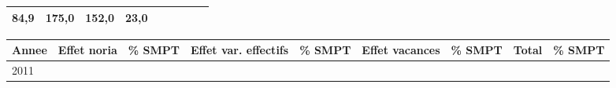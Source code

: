 \begin{longtable}[]{@{}lllllllll@{}}
\begin{minipage}[t]{0.10\columnwidth}
84,9\strut
\end{minipage} & \begin{minipage}[t]{0.07\columnwidth}\raggedright
175,0\strut
\end{minipage} & \begin{minipage}[t]{0.07\columnwidth}\raggedright
152,0\strut
\end{minipage} & \begin{minipage}[t]{0.11\columnwidth}\raggedright
23,0\strut
\end{minipage} & \begin{minipage}[t]{0.14\columnwidth}\raggedright
\strut
\end{minipage}\tabularnewline
\bottomrule
\end{longtable}

\begin{longtable}[]{@{}lllllllll@{}}
\toprule
\begin{minipage}[b]{0.05\columnwidth}\raggedright
Annee\strut
\end{minipage} & \begin{minipage}[b]{0.10\columnwidth}\raggedright
Effet noria\strut
\end{minipage} & \begin{minipage}[b]{0.06\columnwidth}\raggedright
\% SMPT\strut
\end{minipage} & \begin{minipage}[b]{0.16\columnwidth}\raggedright
Effet var. effectifs\strut
\end{minipage} & \begin{minipage}[b]{0.06\columnwidth}\raggedright
\% SMPT\strut
\end{minipage} & \begin{minipage}[b]{0.12\columnwidth}\raggedright
Effet vacances\strut
\end{minipage} & \begin{minipage}[b]{0.06\columnwidth}\raggedright
\% SMPT\strut
\end{minipage} & \begin{minipage}[b]{0.10\columnwidth}\raggedright
Total\strut
\end{minipage} & \begin{minipage}[b]{0.06\columnwidth}\raggedright
\% SMPT\strut
\end{minipage}\tabularnewline
\midrule
\endhead
\begin{minipage}[t]{0.05\columnwidth}\raggedright
2011\strut
\end{minipage} & \begin{minipage}[t]{0.10\columnwidth}\raggedright

\end{minipage}
\end{longtable}
